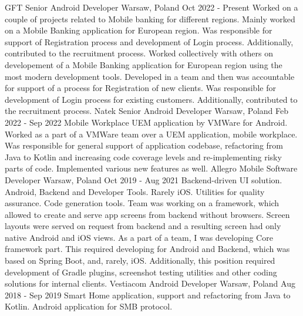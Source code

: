 
\cvexperience
  {GFT}
  {Senior Android Developer}
  {Warsaw, Poland}
  {Oct 2022 - Present}
  {
    Worked on a couple of projects related to Mobile banking for different regions.
    Mainly worked on a Mobile Banking application for European region.
    Was responsible for support of Registration process and development of Login process.
    Additionally, contributed to the recruitment process.
  }
  {
    Worked collectively with others on developement of a Mobile Banking application for European region using the most modern development tools.
    Developed in a team and then was accountable for support of a process for Registration of new clients.
    Was responsible for development of Login process for existing customers.
    Additionally, contributed to the recruitment process.
  }
\cvexperience
  {Natek}
  {Senior Android Developer}
  {Warsaw, Poland}
  {Feb 2022 - Sep 2022}
  {
    Mobile Workplace UEM application by VMWare for Android.
  }
  {
    Worked as a part of a VMWare team over a UEM application, mobile workplace. 
    \newline
    Was responsible for general support of application codebase, refactoring from Java to Kotlin and
    increasing code coverage levels and re-implementing risky parts of code.
    Implemented various new features as well.
  }
\cvexperience
  {Allegro}
  {Mobile Software Developer}
  {Warsaw, Poland}
  {Oct 2019 - Aug 2021}
  {
    Backend-driven UI solution. Android, Backend and Developer Tools. Rarely iOS.
    \newline
    Utilities for quality assurance. Code generation tools.
  }
  {
    Team was working on a framework, which allowed to create and serve app screens from backend without browsers.
    \newline
    Screen layouts were served on request from backend and a resulting screen had only native Android and iOS views.
    \newline
    As a part of a team, I was developing Core framework part.
    This required developing for Android and Backend, which was based on Spring Boot, and, rarely, iOS.
    Additionally, this position required development of Gradle plugins, screenshot testing utilities and
    other coding solutions for internal clients.
  }
\cvexperience
  {Vestiacom}
  {Android Developer}
  {Warsaw, Poland}
  {Aug 2018 - Sep 2019}
  {
    Smart Home application, support and refactoring from Java to Kotlin.
    \newline
    Android application for SMB protocol.
  }
